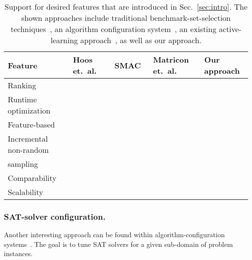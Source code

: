 \documentclass[runningheads]{llncs}
\newcommand{\cmark}{\ding{51}} %
\newcommand{\xmark}{\ding{55}}
\begin{document}
\begin{table}[tbp]
  \centering
  \caption{
  	Support for desired features that are introduced in Sec.~\ref{sec:intro}.
  	The shown approaches include traditional benchmark-set-selection techniques~\cite{HoosKSS13}, an algorithm configuration system~\cite{HutterHL11}, an existing active-learning approach~\cite{MatriconAFSH21}, as well as our approach.
  }
  \label{tab:requirements}
  \vspace{0.2cm}
  \begin{tabular}{
    m{}
    >{\centering\arraybackslash}m{}
    >{\centering\arraybackslash}m{}
    >{\centering\arraybackslash}m{}
    >{\centering\arraybackslash}m{}
  }
    \hline
    Feature & Hoos \mbox{et. al.~\cite{HoosKSS13}} & SMAC~\cite{HutterHL11} & Matricon \mbox{et. al.~\cite{MatriconAFSH21}} & Our approach \\
    \hline
    Ranking & \cmark & \xmark & \cmark & \cmark \\
    Runtime optimization & \xmark & \cmark & \cmark & \cmark \\
    Feature-based & \cmark & \cmark & \cmark & \cmark \\
    Incremental non-random\\ sampling & \xmark & \xmark & \cmark & \cmark \\
    Comparability & \cmark & \xmark & \xmark & \cmark \\
    Scalability & \cmark & \cmark & \xmark & \cmark \\
    \hline
  \end{tabular}
\end{table}

\subsubsection{SAT-solver configuration.}
Another interesting approach can be found within algorithm-configuration systems~\cite{HutterHL11,HoosHL21,Stutzle0P22}.
The goal is to tune SAT solvers for a given sub-domain of problem instances.
\end{document}
